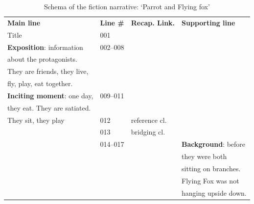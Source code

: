 \documentclass[output=paper]{LSP/langsci}
\begin{document}
\begin{table}[]
\footnotesize
\caption{Schema of the fiction narrative: `Parrot and Flying fox'}
\label{GuTable4}
\begin{tabular}{llll}
\textbf{Main line}                             & \textbf{Line \#} &   \textbf{Recap. Link.}      & \textbf{Supporting line}   \\
  Title                                            & 001               &               &               \\
\textbf{Exposition}: information                 & 002--008          &                 &                  \\
about the protagonists.                        &                    &                 &                       \\
They are friends, they live,                     &                   &                 &                          \\
 fly, play, eat together.                       &                    &                 &                             \\
\textbf{Inciting moment}: one day,         & 009--011               &                 &                           \\
they eat. They are satiated.                               &                &                 &                            \\
They sit, they play                          & 012               &    reference cl.             &                                \\
                                            & 013                 & bridging cl. &                           \\
                                            & 014--017          &                 & \textbf{Background}: before      \\
                                                 &                   &                 & they were both   \\                          
                                                   &                   &                 & sitting on branches.  \\
                                                &                   &                 & Flying Fox  was not            \\          
                                              &                   &                 & hanging upside down.           \\                                     

\end{tabular}
\end{table}
\end{document}
